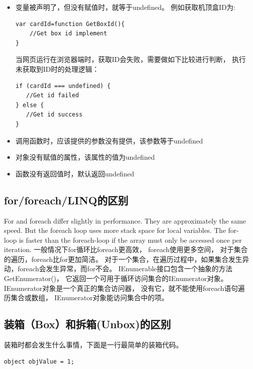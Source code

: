 \documentclass{book}
\begin{document}
\begin{itemize}
\item{变量被声明了，但没有赋值时，就等于undefined。}
例如获取机顶盒ID为:

\begin{lstlisting}[language=VBScript]
var cardId=function GetBoxId(){
	//Get box id implement
}
\end{lstlisting}

当网页运行在浏览器端时，获取ID会失败，需要做如下比较进行判断，
执行未获取到ID时的处理逻辑：

\begin{lstlisting}[language=VBScript]
if (cardId === undefined) {
   //Get id failed
} else {
   //Get id success
}
\end{lstlisting}

\item{调用函数时，应该提供的参数没有提供，该参数等于undefined}
\item{对象没有赋值的属性，该属性的值为undefined}
\item{函数没有返回值时，默认返回undefined}
\end{itemize}


\subsection{for/foreach/LINQ的区别}

For and foreach differ slightly in performance. 
They are approximately the same speed. 
But the foreach loop uses more stack space for local variables. 
The for-loop is faster than the foreach-loop if the array 
must only be accessed once per iteration.
一般情况下for循环比foreach更高效，
foreach使用更多空间，
对于集合的遍历，foreach比for更加简洁。
对于一个集合，在遍历过程中，如果集合发生异动，foreach会发生异常，而for不会。
IEnumerable接口包含一个抽象的方法GetEnumerator()，
它返回一个可用于循环访问集合的IEnumerator对象。
IEnumerator对象是一个真正的集合访问器，
没有它，就不能使用foreach语句遍历集合或数组，
IEnumerator对象能访问集合中的项。

\subsection{装箱（Box）和拆箱(Unbox)的区别}

装箱时都会发生什么事情，下面是一行最简单的装箱代码。

\begin{lstlisting}[language={[Sharp]C}]
object objValue = 1;
\end{lstlisting}
 
\end{document}
